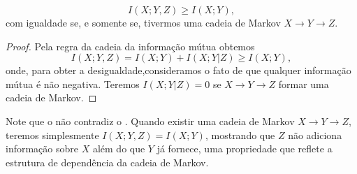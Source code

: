 \begin{theorem}\label{thm:infmutxyzgeq}
  \begin{equation}
    I(X;Y,Z) \geq I(X;Y) ,
  \end{equation}
  com igualdade se, e somente se, tivermos uma cadeia de Markov $X \rightarrow Y \rightarrow Z$.
\end{theorem}
\begin{proof}
  Pela regra da cadeia da informação mútua obtemos
  \begin{equation}
    I(X;Y,Z) = I(X;Y) + I(X;Y|Z) \geq I(X;Y) ,
  \end{equation}
  onde, para obter a desigualdade,consideramos o fato de que qualquer informação mútua é não negativa.
  Teremos $I(X;Y|Z) = 0$ se $X \rightarrow Y \rightarrow Z$ formar uma cadeia de Markov.
\end{proof}

Note que o  não contradiz o .
Quando existir uma cadeia de Markov $X \rightarrow Y \rightarrow Z$, teremos
simplesmente $I(X;Y,Z) = I(X;Y)$, mostrando que $Z$ não adiciona informação sobre $X$
além do que $Y$ já fornece, uma propriedade que reflete a estrutura de dependência da cadeia de Markov.


